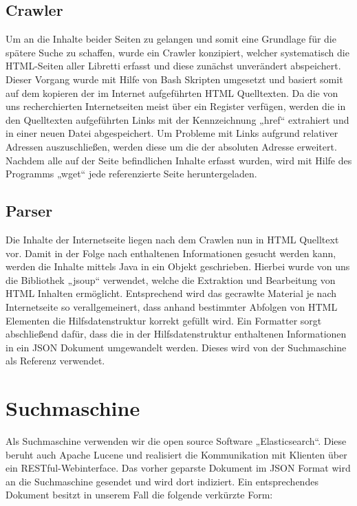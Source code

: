 \subsection{Crawler}
Um an die Inhalte beider Seiten zu gelangen und somit eine Grundlage für die spätere Suche zu schaffen, wurde ein Crawler konzipiert, welcher systematisch die HTML-Seiten aller Libretti erfasst und diese zunächst unverändert abspeichert. Dieser Vorgang wurde mit Hilfe von Bash Skripten umgesetzt und basiert somit auf dem kopieren der im Internet aufgeführten HTML Quelltexten. Da die von uns recherchierten Internetseiten meist über ein Register verfügen, werden die in den Quelltexten aufgeführten Links mit der Kennzeichnung „href“ extrahiert und in einer neuen Datei abgespeichert. Um Probleme mit Links aufgrund relativer Adressen auszuschließen, werden diese um die der absoluten Adresse erweitert. Nachdem alle auf der Seite befindlichen Inhalte erfasst wurden, wird mit Hilfe des Programms „wget“ jede referenzierte Seite heruntergeladen.

\subsection{Parser}
Die Inhalte der Internetseite liegen nach dem Crawlen nun in HTML Quelltext vor. Damit in der Folge nach enthaltenen Informationen gesucht werden kann, werden die Inhalte mittels Java in ein Objekt geschrieben. Hierbei wurde von uns die Bibliothek „jsoup“ verwendet, welche die Extraktion und Bearbeitung von HTML Inhalten ermöglicht. Entsprechend wird das gecrawlte Material je nach Internetseite so verallgemeinert, dass anhand bestimmter Abfolgen von HTML Elementen die Hilfsdatenstruktur korrekt gefüllt wird. 
Ein Formatter sorgt abschließend dafür, dass die in der Hilfsdatenstruktur enthaltenen Informationen in ein JSON Dokument umgewandelt werden. Dieses wird von der Suchmaschine als Referenz verwendet.

\section{Suchmaschine}
Als Suchmaschine verwenden wir die open source Software „Elasticsearch“. Diese beruht auch Apache Lucene und realisiert die Kommunikation mit Klienten über ein RESTful-Webinterface. Das vorher geparste Dokument im JSON Format wird an die Suchmaschine gesendet und wird dort indiziert. Ein entsprechendes Dokument besitzt in unserem Fall die folgende verkürzte Form:


